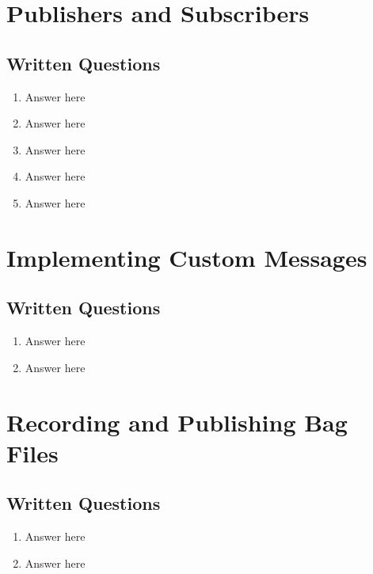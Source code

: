 \documentclass[letta4 paper]{article}
\numberwithin{equation}{section}
\newcommand{\0}{\mathbf{0}}
\begin{document}
	\section{Publishers and Subscribers}
	
	\subsection{Written Questions}
	\begin{enumerate}
		\item Answer here
		\item Answer here
		\item Answer here
		\item Answer here
		\item Answer here
	\end{enumerate}{}
			
	\section{ Implementing Custom Messages}
	
	\subsection{Written Questions}
	\begin{enumerate}
		\item Answer here
		\item Answer here 
	\end{enumerate}{}

	\section{Recording and Publishing Bag Files}
	\subsection{Written Questions}
	
	\begin{enumerate}
		\item Answer here
		\item Answer here 
	\end{enumerate}{}
\end{document}
